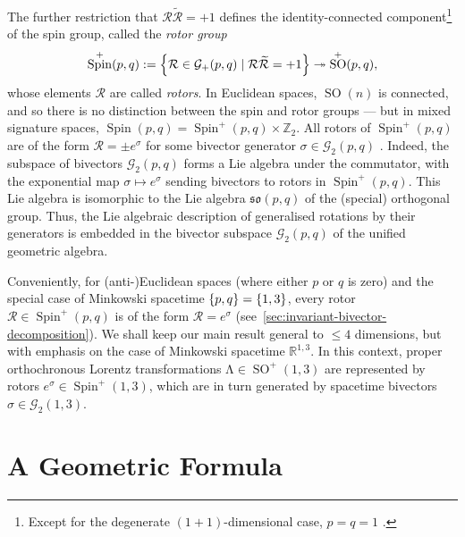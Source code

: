 \documentclass[12pt,a4paper]{article}
\makeatletter
\newif\iffinal
\newcommand{\todo}[1]{\iffinal\else\textcolor{red}{\{\textsc{todo:} #1\}}\fi}
\newcommand\x[1]{\@nameuse{\detokenize{#1}}}
\renewcommand{\vb}[1]{\boldsymbol{#1}}
\newcommand{\vg}[1]{\vb{\gamma}_{#1}}
\newcommand{\GA}[1][]{\mathcal{G}_{#1}}
\newcommand{\rotor}[1]{\mathcal{#1}}
\newcommand{\linmap}[1]{\mathrm{#1}}
\newcommand{\grade}[2][]{\left\langle#2\right\rangle_{#1}}
\newcommand{\rev}[1]{\widetilde{#1}}
\newcommand{\RR}{\mathds{R}}
\newcommand{\ZZ}{\mathds{Z}}
\DeclareMathOperator{\SO}{SO}
\DeclareMathOperator{\Spin}{Spin}
\newcommand{\so}{\mathfrak{so}}
\makeatother
\begin{document}
The further restriction that $\rotor R\rev{\rotor R} = +1$ defines the identity-connected component\footnote{
	Except for the degenerate $(1 + 1)$-dimensional case, $p = q = 1$ \cite{doran2003ga}.
} of the spin group, called the \emph{rotor group}
\begin{align}
	\Spin^+(p, q) :={} \qty{\rotor R \in \GA[+](p, q) \mid \rotor R\rev{\rotor R} = +1}
	\twoheadrightarrow
	\SO^+(p, q)
,\end{align}
whose elements $\rotor R$ are called \emph{rotors}.
In Euclidean spaces, $\SO(n)$ is connected, and so there is no distinction between the spin and rotor groups --- but in mixed signature spaces, $\Spin(p,q) = \Spin^+(p, q) \times{} \ZZ_2$.
All rotors of $\Spin^+(p, q)$ are of the form $\rotor R = \pm e^\sigma{}$ for some bivector generator $\sigma{} \in{} \GA[2](p, q)$ \cite[\textsection{}\,11.3.3]{doran2003ga}.
Indeed, the subspace of bivectors $\GA[2](p, q)$ forms a Lie algebra under the commutator, with the exponential map $\sigma{} \mapsto{} e^\sigma{}$ sending bivectors to rotors in $\Spin^+(p, q)$.
This Lie algebra is isomorphic to the Lie algebra $\so(p, q)$ of the (special) orthogonal group.
Thus, the Lie algebraic description of generalised rotations by their generators is embedded in the bivector subspace $\GA[2](p, q)$ of the unified geometric algebra.

Conveniently, for (anti-)Euclidean spaces (where either $p$ or $q$ is zero) and the special case of Minkowski spacetime $\qty{p, q} = \qty{1, 3}$, every rotor $\rotor R \in{} \Spin^+(p, q)$ is of the form $\rotor R = e^\sigma{}$ (see \textsection{}\,\ref{sec:invariant-bivector-decomposition}).
We shall keep our main result general to $\leq{} 4$ dimensions, but with emphasis on the case of Minkowski spacetime $\RR^{1,3}$.
In this context, proper orthochronous Lorentz transformations $\linmap \Lambda{} \in \SO^+(1,3)$ are represented by rotors $e^\sigma{} \in \Spin^+(1,3)$, which are in turn generated by spacetime bivectors $\sigma{} \in \GA[2](1,3)$.



\section{A Geometric \x{BCH full} Formula}
\end{document}
